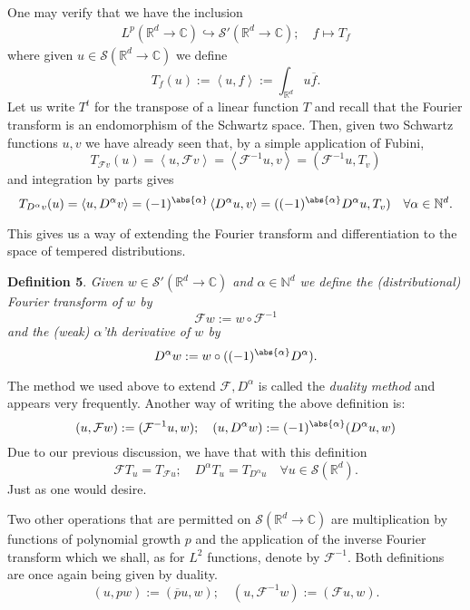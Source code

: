\documentclass[
]{article}
\begin{document}
One may verify that we have the inclusion \[\begin{aligned}
\label{lpisdistr}
    L^p({\mathbb R}^d\to\mathbb{C})\hookrightarrow{\mathcal S}'({\mathbb R}^d\to\mathbb{C});\quad f\mapsto T_f\end{aligned}\]
where given \(u\in {\mathcal S}({\mathbb R}^d\to\mathbb{C})\) we define
\[T_f(u):=\left\langle u,f\right\rangle:=\int_{{\mathbb R}^d} u\overline{f}.\]
Let us write \(T^t\) for the transpose of a linear function \(T\) and
recall that the Fourier transform is an endomorphism of the Schwartz
space. Then, given two Schwartz functions \(u,v\) we have already seen
that, by a simple application of Fubini,
\[T_{\mathcal{F}v}(u)=\left\langle u,\mathcal{F}v\right\rangle=\left\langle\mathcal{F}^{-1} u,v\right\rangle=(\mathcal{F}^{-1}u,T_v)\]
and integration by parts gives
\[T_{D^\alpha v}(u)=\left\langle u,D^\alpha v\right\rangle=(-1)^\abs{\alpha}\left\langle D^\alpha u,v\right\rangle=((-1)^\abs{\alpha}D^\alpha u,T_v)\quad\forall{\alpha}\in {\mathbb{N}^d}.\]

This gives us a way of extending the Fourier transform and
differentiation to the space of tempered distributions.

\textbf{Definition 5}. \emph{Given
\(w\in\mathcal{S}'({\mathbb R}^d\to\mathbb{C})\) and
\(\alpha\in\mathbb{N}^d\) we define the \emph{(distributional) Fourier
transform} of \(w\) by \[\mathcal{F}w:= w\circ \mathcal{F}^{-1}\] and
the \emph{(weak) \(\alpha\)'th} derivative of \(w\) by
\[D^\alpha w:= w\circ((-1)^\abs{\alpha}D^\alpha).\]}

The method we used above to extend \(\mathcal{F}, D^\alpha\) is called
the \emph{duality method} and appears very frequently. Another way of
writing the above definition is:
\[(u, \mathcal{F}w):=(\mathcal{F}^{-1} u, w);\quad(u,D^\alpha w):=(-1)^\abs{\alpha}(D^\alpha u,w)\]
Due to our previous discussion, we have that with this definition
\[\label{ftlpdistr}
    \mathcal{F}T_u=T_{\mathcal{F}u};\quad D^\alpha T_{u}=T_{D^\alpha u}\quad\forall u\in {\mathcal S}({\mathbb R}^d).\]
Just as one would desire.

Two other operations that are permitted on
\({\mathcal S}({\mathbb R}^d\to\mathbb{C})\) are multiplication by
functions of polynomial growth \(p\) and the application of the inverse
Fourier transform which we shall, as for \(L^2\) functions, denote by
\(\mathcal{F}^{-1}\). Both definitions are once again being given by
duality.
\[(u,pw):=(\overline{p}u,w);\quad (u,\mathcal{F}^{-1}w):=(\mathcal{F}u,w) .\]
\end{document}
